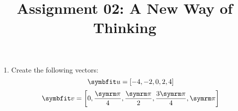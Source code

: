 \documentclass{article}
\title{Assignment 02: A New Way of Thinking}
\begin{document}
\renderTitle

\begin{enumerate}[leftmargin=*]
	\item
		Create the following vectors:
		\begin{equation}
			\mat{u}
			=
			[-4, -2, 0, 2, 4]
		\end{equation}
		\begin{equation}
			\mat{v}
			=
			\left[
				0,
				\frac{\cpi}{4},
				\frac{\cpi}{2},
				\frac{3\cpi}{4},
				\cpi
			\right]
		\end{equation}
\end{enumerate}
\end{document}
